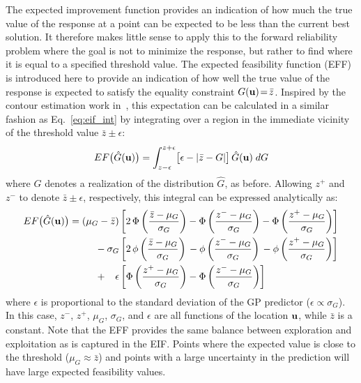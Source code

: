 The expected improvement function provides an indication of how much the true
value of the response at a point can be expected to be less than the current 
best solution.
It therefore makes little sense to apply this to the forward reliability problem 
where the goal is not to minimize the response, but rather to find where it is 
equal to a specified threshold value.
The expected feasibility function (EFF) is introduced here to provide an 
indication of how well the true value of the response is expected to satisfy 
the equality constraint $G({\bf u})\!=\!\bar{z}$.
Inspired by the contour estimation work in~\cite{Ran08}, this 
expectation can be calculated in a similar fashion as Eq.~\ref{eq:eif_int}
by integrating over a region in the immediate vicinity of the threshold value 
$\bar{z}\pm\epsilon$:
\begin{equation}
EF\bigl( \hat{G}({\bf u}) \bigr) = 
  \int_{z-\epsilon}^{z+\epsilon} 
    \bigl[ \epsilon - | \bar{z}-G | \bigr] \, \hat{G}({\bf u}) \; dG
\end{equation}
\noindent where $G$ denotes a realization of the distribution $\hat{G}$, as
before.
Allowing $z^+$ and $z^-$ to denote $\bar{z}\pm\epsilon$, respectively, this 
integral can be expressed analytically as:
\begin{align}
EF\bigl( \hat{G}({\bf u}) \bigr) &= \left( \mu_G - \bar{z} \right)
           \left[ 2 \, \Phi\left( \frac{\bar{z} - \mu_G}{\sigma_G} \right) -
                       \Phi\left( \frac{  z^-   - \mu_G}{\sigma_G} \right) -
                       \Phi\left( \frac{  z^+   - \mu_G}{\sigma_G} \right) 
          \right] \notag \\ & \ \ \ \ \ \ \ \ - 
  \sigma_G \left[ 2 \, \phi\left( \frac{\bar{z} - \mu_G}{\sigma_G} \right) \, -
                       \phi\left( \frac{  z^-   - \mu_G}{\sigma_G} \right) \, -
                       \phi\left( \frac{  z^+   - \mu_G}{\sigma_G} \right) 
          \right] \notag \\ & \ \ \ \ \ \ \ \ + \ \ \,
  \epsilon \left[      \Phi\left( \frac{  z^+   - \mu_G}{\sigma_G} \right) -
                       \Phi\left( \frac{  z^-   - \mu_G}{\sigma_G} \right)
          \right] \label{eq:eff}
\end{align}
where $\epsilon$ is proportional to the standard deviation of the GP 
predictor ($\epsilon\propto\sigma_G$).
In this case, $z^-$, $z^+$, $\mu_G$, $\sigma_G$, and $\epsilon$ are all functions of the 
location ${\bf u}$, while $\bar{z}$ is a constant.
Note that the EFF provides the same balance between exploration and 
exploitation as is captured in the EIF.
Points where the expected value is close to the threshold 
($\mu_G\!\approx\!\bar{z}$) and points with a large uncertainty in the 
prediction will have large expected feasibility values.
